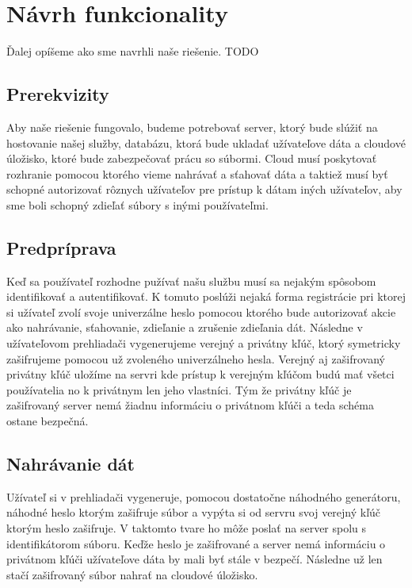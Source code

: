 \chapter{Návrh funkcionality}
	Ďalej opíšeme ako sme navrhli naše riešenie. TODO
	
	\section{Prerekvizity}
	
		Aby naše riešenie fungovalo, budeme potrebovať server, ktorý bude slúžiť na hostovanie našej služby, databázu, ktorá bude ukladať užívateľove dáta a cloudové úložisko, ktoré bude zabezpečovať prácu so súbormi. Cloud musí poskytovať rozhranie pomocou ktorého vieme nahrávať a sťahovať dáta a taktiež musí byť schopné autorizovať rôznych užívateľov pre prístup k dátam iných užívateľov, aby sme boli schopný zdieľať súbory s inými používateľmi. 
		
	\section{Predpríprava}
		
		Keď sa používateľ rozhodne pužívať našu službu musí sa nejakým spôsobom identifikovať a autentifikovať. K tomuto poslúži nejaká forma registrácie pri ktorej si užívateľ zvolí svoje univerzálne heslo pomocou ktorého bude autorizovať akcie ako nahrávanie, sťahovanie, zdieľanie a zrušenie zdieľania dát. Následne v užívateľovom prehliadači vygenerujeme verejný a privátny kľúč, ktorý symetricky zašifrujeme pomocou už zvoleného univerzálneho hesla. Verejný aj zašifrovaný privátny kľúč uložíme na servri kde prístup k verejným kľúčom budú mať všetci používatelia no k privátnym len jeho vlastníci. Tým že privátny kľúč je zašifrovaný server nemá žiadnu informáciu o privátnom kľúči a teda schéma ostane bezpečná.
	
	\section{Nahrávanie dát}
	
		Užívateľ si v prehliadači vygeneruje, pomocou dostatočne náhodného generátoru, náhodné heslo ktorým zašifruje súbor a vypýta si od servru svoj verejný kľúč ktorým heslo zašifruje. V taktomto tvare ho môže poslať na server spolu s identifikátorom súboru. Keďže heslo je zašifrované a server nemá informáciu o privátnom kľúči užívateľove dáta by mali byť stále v bezpečí. Následne už len stačí zašifrovaný súbor nahrať na cloudové úložisko.
		
